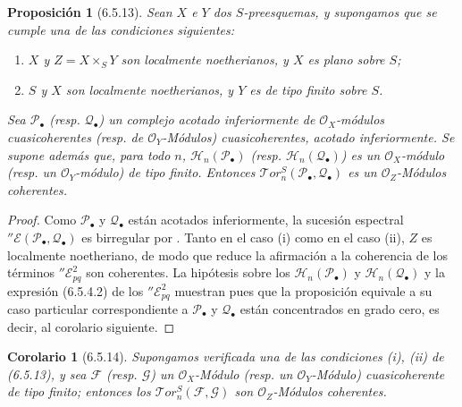 \documentclass[10pt,oneside,openany]{book}
\theoremstyle{egaenv}\newtheorem*{env}{---}
\theoremstyle{egastatement}
\newtheorem*{proposition}{Proposición}
\newtheorem*{corollary}{Corolario}
\theoremstyle{egadescription}
\begin{document}
\begin{proposition}[6.5.13]
\label{III.6.5.13}
Sean $X$ e $Y$ dos $S$-preesquemas, y supongamos que se cumple
una de las condiciones siguientes:
\begin{enumerate}
  \item[\textup{(i)}] $X$ y $Z=X\times_S Y$ son localmente noetherianos, y
    $X$ es plano sobre $S$;
  \item[\textup{(ii)}] $S$ y $X$ son localmente noetherianos, y $Y$ es de
    tipo finito sobre $S$.
\end{enumerate}
Sea $\mathscr P_\bullet$ \textup{(resp.} $\mathscr Q_\bullet$) un complejo
acotado inferiormente de $\mathscr O_X$-módulos cuasicoherentes
\textup{(resp.} de $\mathscr O_Y$-Módulos) cuasicoherentes, acotado inferiormente. Se supone además que, para todo $n$,
$\mathscr H_n(\mathscr P_\bullet)$ \textup{(resp.}
$\mathscr H_n(\mathscr Q_\bullet)$) es un $\mathscr O_X$-módulo
\textup{(resp.} un $\mathscr O_Y$-módulo) de tipo finito. Entonces
$\mathscr{T}\!or_n^S(\mathscr P_\bullet,\mathscr Q_\bullet)$
es un $\mathscr O_Z$-Módulos coherentes.
\end{proposition}

\begin{proof}
Como $\mathscr P_\bullet$ y $\mathscr Q_\bullet$ están acotados
inferiormente, la sucesión espectral
$''\mathscr E(\mathscr P_\bullet,\mathscr Q_\bullet)$ es birregular por
. Tanto en el caso (i) como en el caso (ii), $Z$
es localmente noetheriano, de modo que  reduce
la afirmación a la coherencia de los términos
$''\mathscr E_{pq}^2$ son coherentes. La hipótesis sobre los
$\mathscr H_n(\mathscr P_\bullet)$ y
$\mathscr H_n(\mathscr Q_\bullet)$ y la expresión (6.5.4.2) de los
$''\mathscr E_{pq}^2$ muestran pues que la proposición equivale a su
caso particular correspondiente a $\mathscr P_\bullet$ y $\mathscr Q_\bullet$ están
concentrados en grado cero, es decir, al corolario siguiente.
\end{proof}

\begin{corollary}[6.5.14]
Supongamos verificada una de las condiciones \textup{(i), (ii)} de \textup{(6.5.13)}, y sea
$\mathscr F$ \textup{(resp.} $\mathscr G$) un $\mathscr O_X$-Módulo \textup{(resp.} un
$\mathscr O_Y$-Módulo) cuasicoherente de tipo finito; entonces los
$\mathscr{T}\!or_n^S(\mathscr F,\mathscr G)$ son $\mathscr O_Z$-Módulos
coherentes.
\end{corollary}
\end{document}
